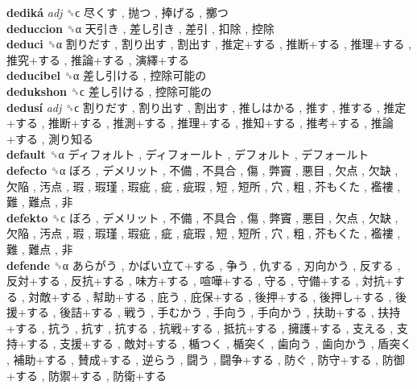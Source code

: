 \textbf{dediká} \emph{adj}  ␝ϲ   尽くす ,  抛つ ,  捧げる ,  擲つ   \\
\textbf{deduccion} ␝α   天引き ,  差し引き ,  差引 ,  扣除 ,  控除   \\
\textbf{deduci} ␝α   割りだす ,  割り出す ,  割出す ,  推定+する ,  推断+する ,  推理+する ,  推究+する ,  推論+する ,  演繹+する   \\
\textbf{deducibel} ␝α   差し引ける ,  控除可能の   \\
\textbf{dedukshon} ␝ϲ   差し引ける ,  控除可能の   \\
\textbf{dedusí} \emph{adj}  ␝ϲ   割りだす ,  割り出す ,  割出す ,  推しはかる ,  推す ,  推する ,  推定+する ,  推断+する ,  推測+する ,  推理+する ,  推知+する ,  推考+する ,  推論+する ,  測り知る   \\
\textbf{default} ␝α   ディフォルト ,  ディフォールト ,  デフォルト ,  デフォールト   \\
\textbf{defecto} ␝α   ぼろ ,  デメリット ,  不備 ,  不具合 ,  傷 ,  弊竇 ,  悪目 ,  欠点 ,  欠缺 ,  欠陥 ,  汚点 ,  瑕 ,  瑕瑾 ,  瑕疵 ,  疵 ,  疵瑕 ,  短 ,  短所 ,  穴 ,  粗 ,  芥もくた ,  襤褸 ,  難 ,  難点 ,  非   \\
\textbf{defekto} ␝ϲ   ぼろ ,  デメリット ,  不備 ,  不具合 ,  傷 ,  弊竇 ,  悪目 ,  欠点 ,  欠缺 ,  欠陥 ,  汚点 ,  瑕 ,  瑕瑾 ,  瑕疵 ,  疵 ,  疵瑕 ,  短 ,  短所 ,  穴 ,  粗 ,  芥もくた ,  襤褸 ,  難 ,  難点 ,  非   \\
\textbf{defende} ␝α   あらがう ,  かばい立て+する ,  争う ,  仇する ,  刃向かう ,  反する ,  反対+する ,  反抗+する ,  味方+する ,  喧嘩+する ,  守る ,  守備+する ,  対抗+する ,  対敵+する ,  幇助+する ,  庇う ,  庇保+する ,  後押+する ,  後押し+する ,  後援+する ,  後詰+する ,  戦う ,  手むかう ,  手向う ,  手向かう ,  扶助+する ,  扶持+する ,  抗う ,  抗す ,  抗する ,  抗戦+する ,  抵抗+する ,  擁護+する ,  支える ,  支持+する ,  支援+する ,  敵対+する ,  楯つく ,  楯突く ,  歯向う ,  歯向かう ,  盾突く ,  補助+する ,  賛成+する ,  逆らう ,  闘う ,  闘争+する ,  防ぐ ,  防守+する ,  防御+する ,  防禦+する ,  防衛+する   \\
